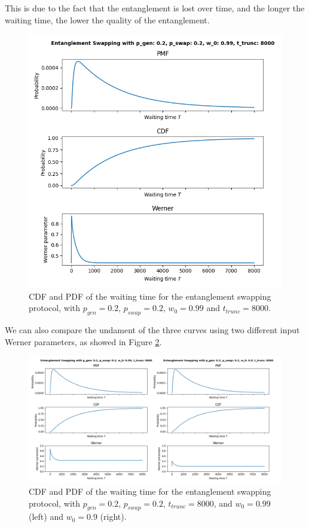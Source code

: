 \documentclass{masterthesis}
\begin{document}
This is due to the fact that the entanglement is lost over time, and the longer the waiting time, the lower the quality of the entanglement.
\begin{figure}[ht]
    \centering
    \includegraphics[width=1\linewidth]{images/swap_example_8000.png}
    \caption{CDF and PDF of the waiting time for the entanglement swapping protocol, with $p_{gen} = 0.2$, $p_{swap} = 0.2$, $w_0 = 0.99$ and $t_{trunc} = 8000$.}
    \label{fig:swap}
\end{figure}

We can also compare the undament of the three curves using two different input Werner parameters, as showed in Figure \ref{fig:swap_comparison}.

\begin{figure}[ht]
    \centering
    \includegraphics[width=1\linewidth]{images/swap_n3_comparison.png}
    \caption{CDF and PDF of the waiting time for the entanglement swapping protocol, with $p_{gen} = 0.2$, $p_{swap} = 0.2$, $t_{trunc} = 8000$, and $w_0 = 0.99$ (left) and $w_0 = 0.9$ (right).}
    \label{fig:swap_comparison}
\end{figure}
\end{document}
